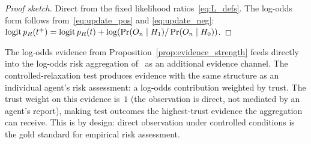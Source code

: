 \begin{proof}[Proof sketch]
Direct from the fixed likelihood ratios~\eqref{eq:L_defs}.  The
log-odds form follows from~\eqref{eq:update_pos} and
\eqref{eq:update_neg}: $\operatorname{logit} p_R(t^+) = \operatorname{logit} p_R(t) +
\log(\Pr(O_n \mid H_1) / \Pr(O_n \mid H_0))$.
\end{proof}

\begin{remark}
\label{rem:log_odds_integration}
The log-odds evidence from
Proposition~\ref{prop:evidence_strength} feeds directly into the
log-odds risk aggregation
of~\citep[Definition~5]{lasser2026scm} as an additional
evidence channel.  The controlled-relaxation test produces
evidence with the same structure as an individual agent's risk
assessment: a log-odds contribution weighted by trust.  The
trust weight on this evidence is~$1$ (the observation is direct,
not mediated by an agent's report), making test outcomes the
highest-trust evidence the aggregation can receive.  This is by
design: direct observation under controlled conditions is the
gold standard for empirical risk assessment.
\end{remark}
